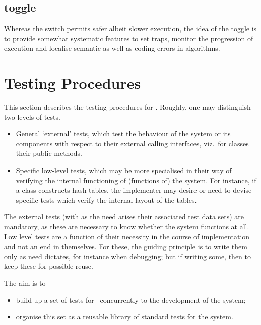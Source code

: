 \subsection{ toggle}

Whereas the  switch permits safer albeit slower execution,
the idea of the  toggle is to provide somewhat systematic
features to set traps, monitor the progression of execution and
localise semantic as well as coding errors in algorithms.


\section{Testing Procedures}

This section describes the testing procedures for \magnus.
Roughly, one may distinguish two levels of tests.

\begin{itemize}
\item
General `external' tests, which test the behaviour
of the system or its components
with respect to their external calling interfaces, viz.~for classes
their public methods.

\item
Specific low-level tests, which may be more specialised in their
way of verifying the internal functioning of (functions of) the
system. For instance, if a  class constructs hash tables,
the implementer may desire or need to devise specific tests which
verify the internal layout of the tables.

\end{itemize}

The external tests (with as the need arises their associated test data
sets) are mandatory, as these are necessary to know whether the system
functions at all. Low level tests are a function of their necessity in
the course of implementation and not an end in themselves. For these, the 
guiding principle is to write them only as need dictates, for instance
when debugging; but if writing some, then to keep these for possible
reuse.


The aim is to 

\begin{itemize}
\item
build up a set of tests for \magnus\ concurrently
to the development of the system;

\item
organise this set as a reusable library of standard tests for
the system.

\end{itemize}


